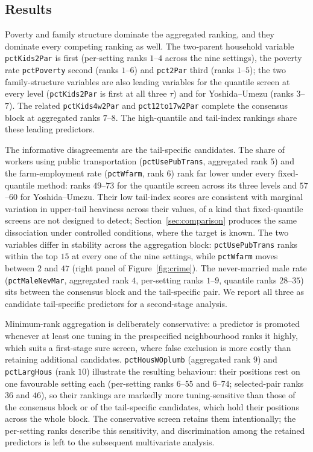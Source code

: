 \documentclass[bj,authoryear]{imsart}
\theoremstyle{plain}
\begin{document}
\subsection{Results}

Poverty and family structure dominate the aggregated ranking, and they
dominate every competing ranking as well. The two-parent household
variable \texttt{pctKids2Par} is first (per-setting ranks $1$--$4$
across the nine settings), the poverty rate \texttt{pctPoverty} second
(ranks $1$--$6$) and \texttt{pct2Par} third (ranks $1$--$5$); the two
family-structure variables are also leading variables for the quantile
screen at every level (\texttt{pctKids2Par} is first at all three
$\tau$) and for Yoshida--Umezu (ranks $3$--$7$). The related
\texttt{pctKids4w2Par} and \texttt{pct12to17w2Par} complete the
consensus block at aggregated ranks $7$--$8$. The high-quantile and
tail-index rankings share these leading predictors.

The informative disagreements are the tail-specific candidates. The
share of workers using public transportation
(\texttt{pctUsePubTrans}, aggregated rank $5$) and the farm-employment
rate (\texttt{pctWfarm}, rank $6$) rank far lower under every
fixed-quantile method: ranks $49$--$73$ for the quantile screen across
its three levels and $57$--$60$ for Yoshida--Umezu. Their low
tail-index scores are consistent with marginal variation in upper-tail
heaviness across their values, of a kind that fixed-quantile screens are
not designed to detect; Section~\ref{sec:comparison} produces the same
dissociation under controlled conditions, where the target is known.
The two variables differ in stability across the aggregation block:
\texttt{pctUsePubTrans} ranks within the top $15$ at every one of the
nine settings, while \texttt{pctWfarm} moves between $2$ and $47$
(right panel of Figure~\ref{fig:crime}). The never-married male rate
(\texttt{pctMaleNevMar}, aggregated rank $4$, per-setting ranks
$1$--$9$, quantile ranks $28$--$35$) sits between the consensus block
and the tail-specific pair. We report all three as candidate
tail-specific predictors for a second-stage analysis.

Minimum-rank aggregation is deliberately conservative: a predictor is
promoted whenever at least one tuning in the prespecified neighbourhood
ranks it highly, which suits a first-stage sure screen, where false
exclusion is more costly than retaining additional candidates.
\texttt{pctHousWOplumb} (aggregated rank $9$) and \texttt{pctLargHous}
(rank $10$) illustrate the resulting behaviour: their positions rest on
one favourable setting each (per-setting ranks $6$--$55$ and $6$--$74$;
selected-pair ranks $36$ and $46$), so their rankings are markedly more
tuning-sensitive than those of the consensus block or of the
tail-specific candidates, which hold their positions across the whole
block. The conservative screen retains them intentionally; the
per-setting ranks describe this sensitivity, and discrimination among
the retained predictors is left to the subsequent multivariate
analysis.
\end{document}
